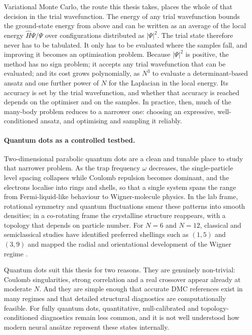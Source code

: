 Variational Monte Carlo, the route this thesis takes, places the whole of that decision in
the trial wavefunction. The energy of any trial wavefunction bounds the ground-state energy
from above and can be written as an average of the local energy $\hat H\Psi/\Psi$ over
configurations distributed as $|\Psi|^2$. The trial state therefore never has to be
tabulated. It only has to be evaluated where the samples fall, and improving it becomes an
optimisation problem. Because $|\Psi|^2$ is positive, the method has no sign problem; it
accepts any trial wavefunction that can be evaluated; and its cost grows polynomially, as
$N^3$ to evaluate a determinant-based ansatz and one further power of $N$ for the Laplacian
in the local energy. Its accuracy is set by the trial wavefunction, and whether that
accuracy is reached depends on the optimiser and on the samples. In practice, then, much of
the many-body problem reduces to a narrower one: choosing an expressive, well-conditioned
ansatz, and optimising and sampling it reliably.

\paragraph{Quantum dots as a controlled testbed.}
Two-dimensional parabolic quantum dots are a clean and tunable place to study that
narrower problem. As the trap frequency $\omega$ decreases, the single-particle level
spacing collapses while Coulomb repulsion becomes dominant, and the electrons localise into
rings and shells, so that a single system spans the range from Fermi-liquid-like
behaviour to Wigner-molecule physics. In the lab frame, rotational symmetry and quantum
fluctuations smear these patterns into smooth densities; in a co-rotating frame the
crystalline structure reappears, with a topology that depends on particle number. For $N{=}6$ and
$N{=}12$, classical and semiclassical studies have identified preferred shellings such as
$(1,5)$ and $(3,9)$ and mapped the radial and orientational development of the Wigner regime
\cite{ReimannManninen2002-QDReview,Egger_1999,Kong_2002,schweigert1994spectralpropertieschargedparticles,manninen2007metalclustersquantumdots,Cavaliere2009-WignerTransport,Ghosal2007-WignerMolecules}.

Quantum dots suit this thesis for two reasons. They are genuinely non-trivial: Coulomb
singularities, strong correlation and a real crossover appear already at moderate $N$.
And they are simple enough that accurate DMC references exist in many regimes and that
detailed structural diagnostics are computationally feasible. For fully quantum dots,
quantitative, null-calibrated and topology-conditioned diagnostics remain less common, and
it is not well understood how modern neural ans\"atze
represent these states internally.

